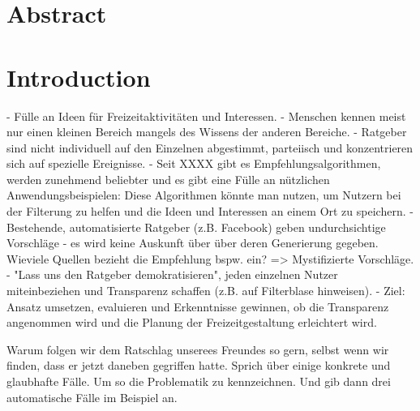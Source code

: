\documentclass[12pt,numbers=noenddot,parskip,bibliography=totocnumbered,listof=totocnumbered]{scrreprt}
\begin{document}





\chapter*{Abstract}

\chapter{Introduction}


- Fülle an Ideen für Freizeitaktivitäten und Interessen.
- Menschen kennen meist nur einen kleinen Bereich mangels des Wissens der anderen Bereiche.
- Ratgeber sind nicht individuell auf den Einzelnen abgestimmt, parteiisch und konzentrieren sich auf spezielle Ereignisse.
- Seit XXXX gibt es Empfehlungsalgorithmen, werden zunehmend beliebter und es gibt eine Fülle an nützlichen Anwendungsbeispielen: Diese Algorithmen könnte man nutzen, um Nutzern bei der Filterung zu helfen und die Ideen und Interessen an einem Ort zu speichern.
- Bestehende, automatisierte Ratgeber (z.B. Facebook) geben undurchsichtige Vorschläge - es wird keine Auskunft über über deren Generierung gegeben. Wieviele Quellen bezieht die Empfehlung bspw. ein? => Mystifizierte Vorschläge.
- "Lass uns den Ratgeber demokratisieren", jeden einzelnen Nutzer miteinbeziehen und Transparenz schaffen (z.B. auf Filterblase hinweisen).
- Ziel: Ansatz umsetzen, evaluieren und Erkenntnisse gewinnen, ob die Transparenz angenommen wird und die Planung der Freizeitgestaltung erleichtert wird.



Warum folgen wir dem Ratschlag unserees Freundes so gern, selbst wenn wir finden, dass er jetzt daneben gegriffen hatte. Sprich über einige konkrete und glaubhafte Fälle. Um so die Problematik zu kennzeichnen. Und gib dann drei automatische Fälle im Beispiel an.
\end{document}
